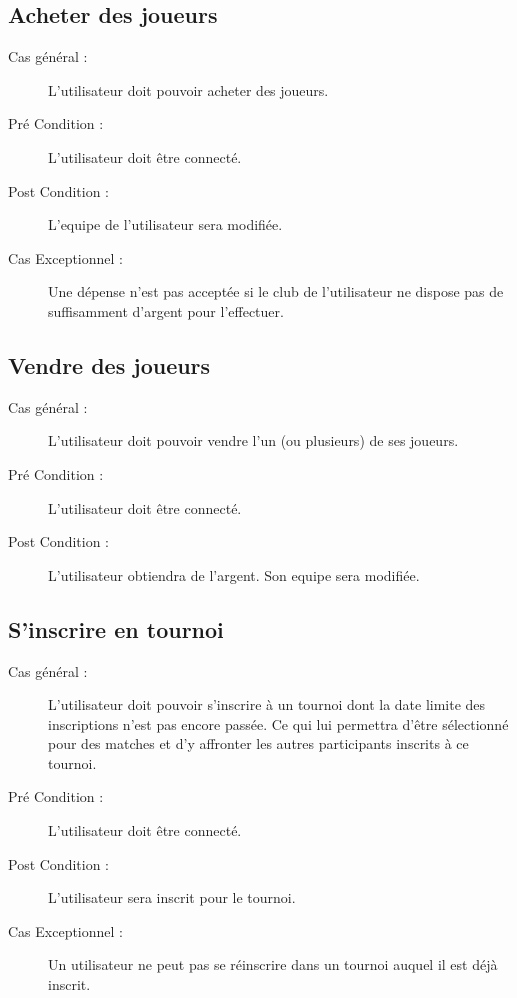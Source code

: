 \documentclass[a4paper]{report}
\begin{document}
\subsection{Acheter des \glspl{joueur}}
\begin{description}
    \item[Cas général :] L'\gls{utilisateur} doit pouvoir acheter des \glspl{joueur}.
    \item[Pré Condition  :] L'\gls{utilisateur} doit être connecté.
    \item[Post Condition :] L'\gls{equipe} de l'\gls{utilisateur} sera modifiée.
    \item[Cas Exceptionnel :] Une dépense n'est pas acceptée si le \gls{club} de l'\gls{utilisateur} ne dispose pas de suffisamment d'argent pour l'effectuer.
\end{description}

\subsection{Vendre des \glspl{joueur}}
\begin{description}
    \item[Cas général :] L'\gls{utilisateur} doit pouvoir vendre l'un (ou plusieurs) de ses \glspl{joueur}.
    \item[Pré Condition  :] L'\gls{utilisateur} doit être connecté.
    \item[Post Condition :] L'\gls{utilisateur} obtiendra de l'argent. Son \gls{equipe} sera modifiée.
\end{description}

\subsection{S'inscrire en tournoi}
\begin{description}
    \item[Cas général :] L'\gls{utilisateur} doit pouvoir s'inscrire à un tournoi dont la date limite des inscriptions n'est pas encore passée.
        Ce qui lui permettra d'être sélectionné pour des matches et d'y affronter les autres \glspl{participant} inscrits à ce tournoi.
    \item[Pré Condition  :] L'\gls{utilisateur} doit être connecté.
    \item[Post Condition :] L'\gls{utilisateur} sera inscrit pour le tournoi.
    \item[Cas Exceptionnel :] Un \gls{utilisateur} ne peut pas se réinscrire dans un tournoi auquel il est déjà inscrit.
\end{description} 
\end{document}
